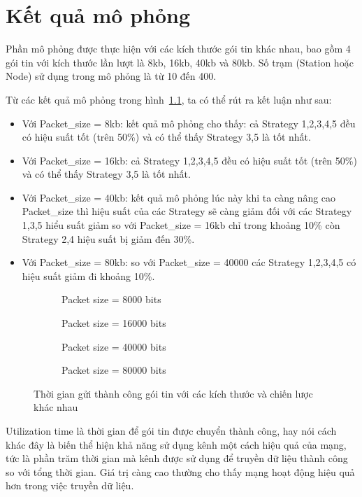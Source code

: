 \chapter{Kết quả mô phỏng}
\label{ch::chapter3}

Phần mô phỏng được thực hiện với các kích thước gói tin khác nhau, bao gồm 4 gói tin với kích thước lần lượt là 8kb, 16kb, 40kb và 80kb. Số trạm (Station hoặc Node) sử dụng trong mô phỏng là từ 10 đến 400.

Từ các kết quả mô phỏng trong hình~\ref{fig:result}, ta có thể rút ra kết luận như sau:
\begin{itemize}
    \item Với Packet\_size = 8kb: kết quả mô phỏng cho thấy: cả Strategy 1,2,3,4,5 đều có hiệu suất tốt (trên 50\%) và có thể thấy Strategy 3,5 là tốt nhất.
    \item Với Packet\_size = 16kb: cả Strategy 1,2,3,4,5 đều có hiệu suất tốt (trên 50\%) và có thể thấy Strategy 3,5 là tốt nhất.
    \item Với Packet\_size = 40kb: kết quả mô phỏng lúc này khi ta càng nâng cao Packet\_size thì hiệu suất của các Strategy sẽ càng giảm đối với các Strategy 1,3,5 hiểu suất giảm so với Packet\_size = 16kb chỉ trong khoảng 10\% còn Strategy 2,4 hiệu suất bị giảm đến 30\%.
    \item Với Packet\_size = 80kb: so với Packet\_size = 40000 các Strategy 1,2,3,4,5 có hiệu suất giảm đi khoảng 10\%.
\end{itemize}

\begin{figure}[h]
    \centering
    \begin{subfigure}{0.45\linewidth}
        
        \centering
        \caption{Packet size = 8000 bits}
    \end{subfigure}
    \hfill
    \begin{subfigure}{0.45\linewidth}
        \centering
        
        \caption{Packet size = 16000 bits}
    \end{subfigure}


    \begin{subfigure}{0.45\linewidth}
        \centering
        
        \caption{Packet size = 40000 bits}
    \end{subfigure}
    \hfill
    \begin{subfigure}{0.45\linewidth}
        \centering
        
        \caption{Packet size = 80000 bits}
    \end{subfigure}

    \caption{Thời gian gửi thành công gói tin với các kích thước và chiến lược khác nhau}
    \label{fig:result}
\end{figure}

Utilization time là thời gian để gói tin được chuyển thành công, hay nói cách khác đây là biến thể hiện khả năng sử dụng kênh một cách hiệu quả của mạng, tức là phần trăm thời gian mà kênh được sử dụng để truyền dữ liệu thành công so với tổng thời gian. Giá trị càng cao thường cho thấy mạng hoạt động hiệu quả hơn trong việc truyền dữ liệu.
